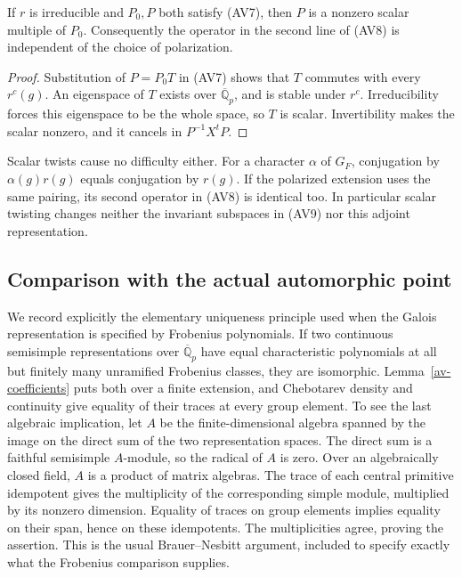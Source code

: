 \begin{lemma}\label{av-pairing-unique}
If $r$ is irreducible and $P_0,P$ both satisfy (AV7), then
$P$ is a nonzero scalar multiple of $P_0$. Consequently the
operator in the second line of (AV8) is independent of the
choice of polarization.
\end{lemma}
\begin{proof}
Substitution of $P=P_0T$ in (AV7) shows that $T$ commutes
with every $r^c(g)$. An eigenspace of $T$ exists over
$\overline{\mathbb Q}_p$, and is stable under $r^c$.
Irreducibility forces this eigenspace to be the whole space,
so $T$ is scalar. Invertibility makes the scalar nonzero,
and it cancels in $P^{-1}X^tP$.
\end{proof}

Scalar twists cause no difficulty either. For a character
$\alpha$ of $G_F$, conjugation by $\alpha(g)r(g)$ equals
conjugation by $r(g)$. If the polarized extension uses the
same pairing, its second operator in (AV8) is identical too.
In particular scalar twisting changes neither the invariant
subspaces in (AV9) nor this adjoint representation.

\subsection{Comparison with the actual automorphic point}

We record explicitly the elementary uniqueness principle used
when the Galois representation is specified by Frobenius
polynomials. If two continuous semisimple representations
over $\overline{\mathbb Q}_p$ have equal characteristic
polynomials at all but finitely many unramified Frobenius
classes, they are isomorphic. Lemma~\ref{av-coefficients}
puts both over a finite extension, and Chebotarev density
and continuity give equality of their traces at every group
element. To see the last algebraic implication, let $A$ be
the finite-dimensional algebra spanned by the image on the
direct sum of the two representation spaces. The direct
sum is a faithful semisimple $A$-module, so the radical of
$A$ is zero. Over an algebraically closed field, $A$ is a
product of matrix algebras. The trace of each central
primitive idempotent gives the multiplicity of the
corresponding simple module, multiplied by its nonzero
dimension. Equality of traces on group elements implies
equality on their span, hence on these idempotents. The
multiplicities agree, proving the assertion. This is the
usual Brauer--Nesbitt argument, included to specify exactly
what the Frobenius comparison supplies.

